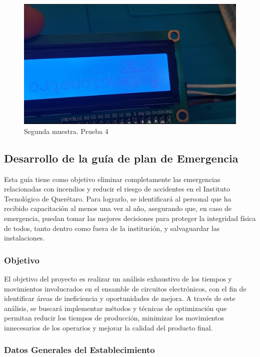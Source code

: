 \begin{figure}[H]
        \centering
        \includegraphics[trim = {30mm 30mm 30mm 30mm},clip,scale=0.2]{10/Img/muestra2Prueba4.jpg}
        \caption{Segunda muestra. Prueba 4}
        \label{Prueba 2.4}
    \end{figure}

\subsection{Desarrollo de la guía de plan de Emergencia}

Esta guía tiene como objetivo eliminar completamente las emergencias relacionadas con incendios y reducir el riesgo de accidentes en el Instituto Tecnológico de Querétaro. Para lograrlo, se identificará al personal que ha recibido capacitación al menos una vez al año, asegurando que, en caso de emergencia, puedan tomar las mejores decisiones para proteger la integridad física de todos, tanto dentro como fuera de la institución, y salvaguardar las instalaciones.
%
%
\subsubsection{Objetivo}

El objetivo del proyecto es realizar un análisis exhaustivo de los tiempos y movimientos involucrados en el ensamble de circuitos electrónicos, con el fin de identificar áreas de ineficiencia y oportunidades de mejora. A través de este análisis, se buscará implementar métodos y técnicas de optimización que permitan reducir los tiempos de producción, minimizar los movimientos innecesarios de los operarios y mejorar la calidad del producto final.
%
%
\subsubsection{Datos Generales del Establecimiento}


